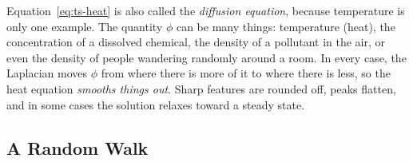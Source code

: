 Equation~\eqref{eq:ts-heat} is also called the \emph{diffusion equation}, because
temperature is only one example. The quantity $\phi$ can be many things: temperature (heat), the concentration of a
dissolved chemical, the density of a pollutant in the air, or even the density
of people wandering randomly around a room. In every case, the Laplacian moves
$\phi$ from where there is more of it to where there is less, so the heat
equation \emph{smooths things out}. Sharp features are rounded off, peaks
flatten, and in some cases the solution relaxes toward a steady state.

\subsection{A Random Walk}
\label{sec:ts-walk}

